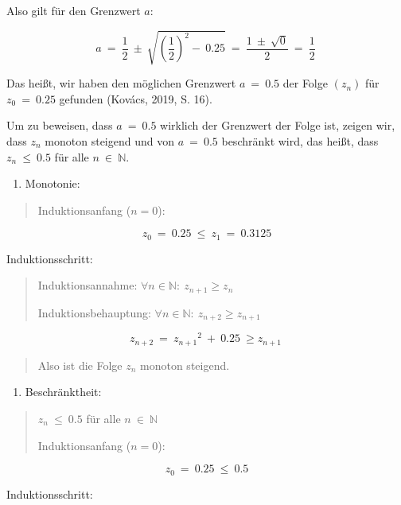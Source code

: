 \documentclass{book}
\begin{document}
\begin{longtable}[]
\begin{minipage}[b]{\linewidth}
Also gilt für den Grenzwert \(a\):

\[a\  = \ \frac{1}{2}\  \pm \ \sqrt{\left( \frac{1}{2} \right)^{2} - \ 0.25}\  = \ \frac{1\  \pm \ \sqrt{0}}{2}\  = \ \frac{1}{2}\ \]

Das heißt, wir haben den möglichen Grenzwert \(a\  = \ 0.5\) der Folge
\(\left( z_{n} \right)\) für \(z_{0}\  = \ 0.25\) gefunden (Kovács,
2019, S. 16).

Um zu beweisen, dass \(a\  = \ 0.5\) wirklich der Grenzwert der Folge
ist, zeigen wir, dass \(z_{n}\) monoton steigend und von \(a\  = \ 0.5\)
beschränkt wird, das heißt, dass \(z_{n}\  \leq \ 0.5\) für alle
\(n\mathbb{\  \in \ N}\).

\begin{enumerate}
\def\labelenumi{\arabic{enumi})}
\item
  Monotonie:
\end{enumerate}

\begin{quote}
Induktionsanfang (\(n = 0\)):
\end{quote}

\[z_{0}\  = \ 0.25\  \leq \ z_{1}\  = \ 0.3125\]

Induktionsschritt:

\begin{quote}
Induktionsannahme: \(\forall n \in \mathbb{N:\ }z_{n + 1} \geq z_{n}\)

Induktionsbehauptung:
\(\forall n \in \mathbb{N:\ }z_{n + 2} \geq z_{n + 1}\)
\end{quote}

\[z_{n + 2}\  = \ {z_{n + 1}}^{2}\  + \ 0.25\  \geq z_{n + 1}\ \]

\begin{quote}
Also ist die Folge \(z_{n}\) monoton steigend.
\end{quote}

\begin{enumerate}
\def\labelenumi{\arabic{enumi})}
\setcounter{enumi}{1}
\item
  Beschränktheit:
\end{enumerate}

\begin{quote}
\(z_{n}\  \leq \ 0.5\) für alle \(n\mathbb{\  \in \ N}\)

Induktionsanfang (\(n = 0\)):
\end{quote}

\[z_{0}\  = \ 0.25\  \leq \ 0.5\]

Induktionsschritt:


\end{minipage}
\end{longtable}
\end{document}
